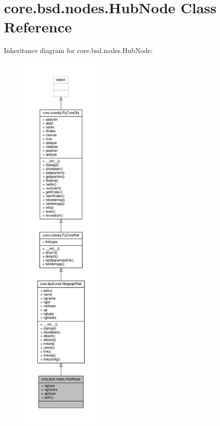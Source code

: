 \hypertarget{classcore_1_1bsd_1_1nodes_1_1_hub_node}{\section{core.\+bsd.\+nodes.\+Hub\+Node Class Reference}
\label{classcore_1_1bsd_1_1nodes_1_1_hub_node}
}


Inheritance diagram for core.\+bsd.\+nodes.\+Hub\+Node\+:
\nopagebreak
\begin{figure}[H]
\begin{center}
\leavevmode
\includegraphics[height=550pt]{classcore_1_1bsd_1_1nodes_1_1_hub_node__inherit__graph}
\end{center}
\end{figure}


